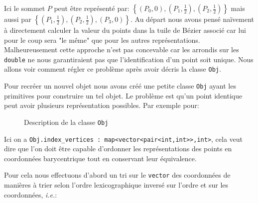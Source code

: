 \documentclass{article}
\begin{document}
Ici le sommet $P$ peut être représenté par: $\left\{(P_{0},0),(P_{1},\frac{1}{2}),(P_{2},\frac{1}{2})\right\}$ mais aussi par $\left\{(P_{1},\frac{1}{2}),(P_{2},\frac{1}{2}),(P_{3},0)\right\}$. Au départ nous avons pensé naïvement à directement calculer la valeur du points dans la tuile de Bézier associé car lui pour le coup sera "le même" que pour les autres représentations. Malheureusement cette approche n'est pas concevable car les arrondis sur les \texttt{double} ne nous garantiraient pas que l'identification d'un point soit unique. Nous allons voir comment régler ce problème après avoir décris la classe \texttt{Obj}.

Pour recréer un nouvel objet nous avons créé une petite classe \texttt{Obj} ayant les primitives pour construire un tel objet. Le problème est qu'un point identique peut avoir plusieurs représentation possibles. Par exemple pour:

\begin{figure}[H]
\centering
{}
\caption{Description de la classe \texttt{Obj}}
\end{figure}

Ici on a \texttt{Obj.index\_vertices : map<vector<pair<int,int>>,int>}, cela veut dire que l'on doit être capable d'ordonner les représentations des points en coordonnées barycentrique tout en conservant leur équivalence.

Pour cela nous effectuons d'abord un tri sur le \texttt{vector} des coordonnées de manières à trier selon l'ordre lexicographique inversé sur l'ordre et sur les coordonnées, \textit{i.e.}:
\end{document}
